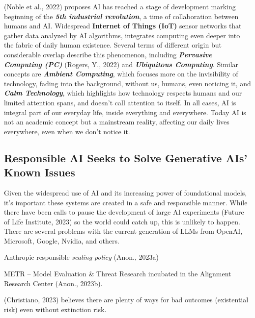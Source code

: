 \documentclass[
  letterpaper,
  DIV=11,
  numbers=noendperiod]{scrartcl}
\begin{document}
(Noble et al., 2022) proposes AI has reached a stage of development
marking beginning of the \textbf{\emph{5th industrial revolution}}, a
time of collaboration between humans and AI. Widespread \textbf{Internet
of Things (IoT)} sensor networks that gather data analyzed by AI
algorithms, integrates computing even deeper into the fabric of daily
human existence. Several terms of different origin but considerable
overlap describe this phenomenon, including \textbf{\emph{Pervasive
Computing (PC)}} (Rogers, Y., 2022) and \textbf{\emph{Ubiquitous
Computing}}. Similar concepts are \textbf{\emph{Ambient Computing}},
which focuses more on the invisibility of technology, fading into the
background, without us, humans, even noticing it, and \textbf{\emph{Calm
Technology}}, which highlights how technology respects humans and our
limited attention spans, and doesn't call attention to itself. In all
cases, AI is integral part of our everyday life, inside everything and
everywhere. Today AI is not an academic concept but a mainstream
reality, affecting our daily lives everywhere, even when we don't notice
it.

\subsection{Responsible AI Seeks to Solve Generative AIs' Known
Issues}\label{responsible-ai-seeks-to-solve-generative-ais-known-issues}

Given the widespread use of AI and its increasing power of foundational
models, it's important these systems are created in a safe and
responsible manner. While there have been calls to pause the development
of large AI experiments (Future of Life Institute, 2023) so the world
could catch up, this is unlikely to happen. There are several problems
with the current generation of LLMs from OpenAI, Microsoft, Google,
Nvidia, and others.

Anthropic responsible \emph{scaling policy} (Anon., 2023a)

METR -- Model Evaluation \& Threat Research incubated in the Alignment
Research Center (Anon., 2023b).

(Christiano, 2023) believes there are plenty of ways for bad outcomes
(existential risk) even without extinction risk.
\end{document}
